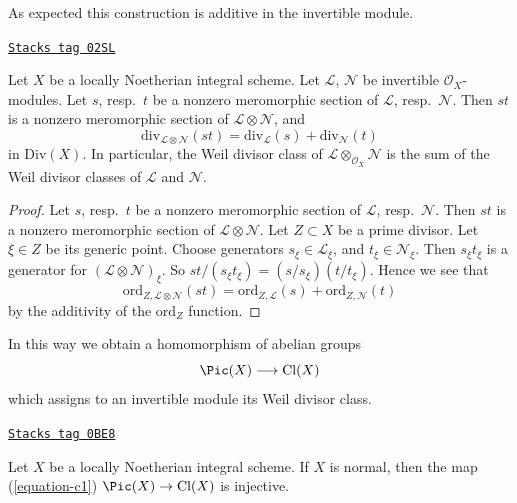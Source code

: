 As expected this construction is additive in the invertible module.

\begin{lemma}[C1 additive]
\label{divisors-lemma-c1-additive}
\href{https://stacks.math.columbia.edu/tag/02SL}{\texttt{Stacks tag 02SL}}

Let $X$ be a locally Noetherian integral scheme.
Let $\mathcal{L}$, $\mathcal{N}$ be invertible $\mathcal{O}_X$-modules.
Let $s$, resp.\ $t$ be a nonzero meromorphic section
of $\mathcal{L}$, resp.\ $\mathcal{N}$. Then $st$ is a nonzero
meromorphic section of $\mathcal{L} \otimes \mathcal{N}$, and
$$
\text{div}_{\mathcal{L} \otimes \mathcal{N}}(st)
=
\text{div}_\mathcal{L}(s) + \text{div}_\mathcal{N}(t)
$$
in $\text{Div}(X)$. In particular, the Weil divisor class of
$\mathcal{L} \otimes_{\mathcal{O}_X} \mathcal{N}$ is the sum
of the Weil divisor classes of $\mathcal{L}$ and $\mathcal{N}$.
\end{lemma}

\begin{proof}
Let $s$, resp.\ $t$ be a nonzero meromorphic section
of $\mathcal{L}$, resp.\ $\mathcal{N}$. Then $st$ is a nonzero
meromorphic section of $\mathcal{L} \otimes \mathcal{N}$.
Let $Z \subset X$ be a prime divisor. Let $\xi \in Z$ be its generic
point. Choose generators $s_\xi \in \mathcal{L}_\xi$, and
$t_\xi \in \mathcal{N}_\xi$. Then $s_\xi t_\xi$ is a generator
for $(\mathcal{L} \otimes \mathcal{N})_\xi$.
So $st/(s_\xi t_\xi) = (s/s_\xi)(t/t_\xi)$.
Hence we see that
$$
\text{ord}_{Z, \mathcal{L} \otimes \mathcal{N}}(st)
=
\text{ord}_{Z, \mathcal{L}}(s) + \text{ord}_{Z, \mathcal{N}}(t)
$$
by the additivity of the $\text{ord}_Z$ function.
\end{proof}

In this way we obtain a homomorphism of abelian groups
\begin{equation}
\label{equation-c1}
\Pic(X) \longrightarrow \text{Cl}(X)
\end{equation}
which assigns to an invertible module its Weil divisor class.

\begin{lemma}
\label{divisors-lemma-normal-c1-injective}
\href{https://stacks.math.columbia.edu/tag/0BE8}{\texttt{Stacks tag 0BE8}}

Let $X$ be a locally Noetherian integral scheme. If $X$ is normal,
then the map (\ref{equation-c1}) $\Pic(X) \to \text{Cl}(X)$
is injective.
\end{lemma}


